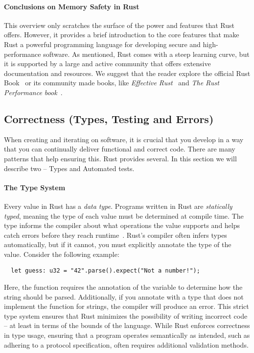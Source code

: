 \documentclass[11pt]{report}
\theoremstyle{definition}
\theoremstyle{plain}
\begin{document}
\paragraph{Conclusions on Memory Safety in Rust}
This overview only scratches the surface of the power and features that Rust offers. However, it provides a brief introduction to the core features that make Rust a powerful programming language for developing secure and high-performance software. As mentioned, Rust comes with a steep learning curve, but it is supported by a large and active community that offers extensive documentation and resources. We suggest that the reader explore the official Rust Book~\cite{rustlangRustProgramming} or its community made books, like \textit{Effective Rust}~\cite{lurklurkEffectiveRust} and \textit{The Rust Performance book}~\cite{rustlangPerformanceBook}.

\subsection{Correctness (Types, Testing and Errors)}
When creating and iterating on software, it is crucial that you develop in a way that you can continually deliver functional and correct code. There are many patterns that help ensuring this. Rust provides several. In this section we will describe two -- Types and Automated tests.

\paragraph{The Type System}\label{sec:rusttypes}
Every value in Rust has a \textit{data type}. Programs written in Rust are \textit{statically typed}, meaning the type of each value must be determined at compile time. The type informs the compiler about what operations the value supports and helps catch errors before they reach runtime~\cite[ch.3.2]{rustlangRustProgramming}. Rust's compiler often infers types automatically, but if it cannot, you must explicitly annotate the type of the value. Consider the following example:

\begin{verbatim} 
  let guess: u32 = "42".parse().expect("Not a number!"); 
\end{verbatim}

Here, the  function requires the annotation of the variable  to determine how the string should be parsed. Additionally, if you annotate  with a type that does not implement the  function for strings, the compiler will produce an error. This strict type system ensures that Rust minimizes the possibility of writing incorrect code -- at least in terms of the bounds of the language. While Rust enforces correctness in type usage, ensuring that a program operates semantically as intended, such as adhering to a protocol specification, often requires additional validation methods.
\end{document}
